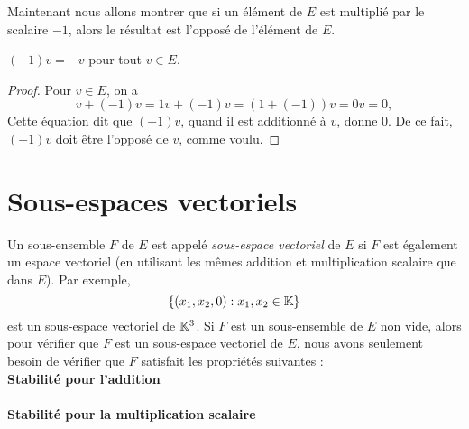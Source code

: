 \documentclass[12pt]{book}
\theoremstyle{plain}
\begin{document}
Maintenant nous allons montrer que si un élément de $E$ est multiplié par le scalaire $-1$, alors le résultat est l'opposé de l'élément de $E$.

\begin{prop}
    $(-1)v=-v$ pour tout $v\in E$.
    \begin{proof}
        Pour $v\in E$, on a
        \begin{equation*}
            v+(-1)v=1v+(-1)v=(1+(-1))v=0v=0,
        \end{equation*}
        Cette équation dit que $(-1)v$, quand il est additionné à $v$, donne 0. De ce fait, $(-1)v$ doit être l'opposé de $v$, comme voulu.
    \end{proof}
\end{prop}

\section*{Sous-espaces vectoriels}

Un {} sous-ensemble $F$ de $E$ est appelé \textit{sous-espace vectoriel} de $E$ si $F$ est également un espace vectoriel (en utilisant les mêmes addition et multiplication scalaire que dans $E$). Par exemple,
\begin{equation*}
    \{(x_1,x_2,0):x_1,x_2\in\mathbb{K}\}
\end{equation*}
est un sous-espace vectoriel de $\mathbb{K}^3$. Si $F$ est un sous-ensemble de $E$ non vide, alors pour vérifier que $F$ est un sous-espace vectoriel de $E$, nous avons seulement besoin de vérifier que $F$ satisfait les propriétés suivantes :\\

\noindent
\textbf{Stabilité pour l'addition}\\
\\

\noindent
\textbf{Stabilité pour la multiplication scalaire}\\
\\
\end{document}

